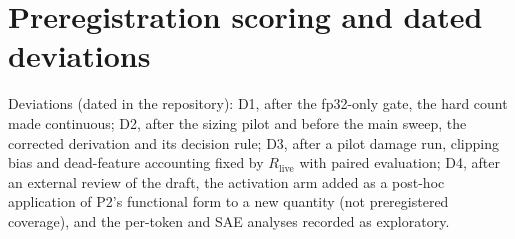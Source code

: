 \documentclass{article}
\begin{document}
\section{Preregistration scoring and dated deviations}
\label{app:score}
\begin{center}\small
{}
\end{center}
Deviations (dated in the repository): D1, after the fp32-only gate, the hard count made continuous; D2, after the sizing
pilot and before the main sweep, the corrected derivation and its decision rule; D3, after a pilot damage run, clipping
bias and dead-feature accounting fixed by $R_{\mathrm{live}}$ with paired evaluation; D4, after an external review of the
draft, the activation arm added as a post-hoc application of P2's functional form to a new quantity (not preregistered
coverage), and the per-token and SAE analyses recorded as exploratory.
\end{document}
